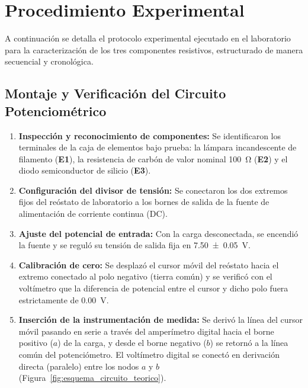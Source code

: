 
\section{Procedimiento Experimental}
\label{sec:procedimiento}

A continuación se detalla el protocolo experimental ejecutado en el laboratorio para la caracterización de los tres componentes resistivos, estructurado de manera secuencial y cronológica.

\subsection{Montaje y Verificación del Circuito Potenciométrico}
\begin{enumerate}
    \item \textbf{Inspección y reconocimiento de componentes:} Se identificaron los terminales de la caja de elementos bajo prueba: la lámpara incandescente de filamento (\textbf{E1}), la resistencia de carbón de valor nominal \qty{100}{\ohm} (\textbf{E2}) y el diodo semiconductor de silicio (\textbf{E3}).
    \item \textbf{Configuración del divisor de tensión:} Se conectaron los dos extremos fijos del reóstato de laboratorio a los bornes de salida de la fuente de alimentación de corriente continua (DC).
    \item \textbf{Ajuste del potencial de entrada:} Con la carga desconectada, se encendió la fuente y se reguló su tensión de salida fija en \qty{7,50 \pm 0,05}{\volt}.
    \item \textbf{Calibración de cero:} Se desplazó el cursor móvil del reóstato hacia el extremo conectado al polo negativo (tierra común) y se verificó con el voltímetro que la diferencia de potencial entre el cursor y dicho polo fuera estrictamente de \qty{0,00}{\volt}.
    \item \textbf{Inserción de la instrumentación de medida:} Se derivó la línea del cursor móvil pasando en serie a través del amperímetro digital hacia el borne positivo ($a$) de la carga, y desde el borne negativo ($b$) se retornó a la línea común del potenciómetro. El voltímetro digital se conectó en derivación directa (paralelo) entre los nodos $a$ y $b$ (Figura~\ref{fig:esquema_circuito_teorico}).
\end{enumerate}

